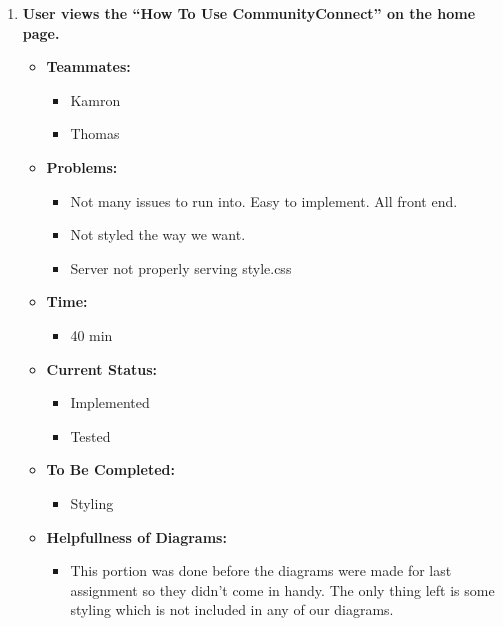 \documentclass[12pt]{article}
\begin{document}
  \begin{enumerate}
    \item \textbf{User views the “How To Use CommunityConnect” on the home page.}
      \begin{itemize}
        \item \textbf{Teammates:}
          \begin{itemize}
            \item Kamron
            \item Thomas
          \end{itemize}
        \item \textbf{Problems:}
          \begin{itemize}
            \item Not many issues to run into. Easy to implement. All front end.
            \item Not styled the way we want.
            \item Server not properly serving style.css
          \end{itemize}
        \item \textbf{Time:}
          \begin{itemize}
            \item 40 min
          \end{itemize}
        \item \textbf{Current Status:}
          \begin{itemize}
            \item Implemented
            \item Tested
          \end{itemize}
        \item \textbf{To Be Completed:}
          \begin{itemize}
            \item Styling
          \end{itemize}
        \item \textbf{Helpfullness of Diagrams:}
          \begin{itemize}
            \item This portion was done before the diagrams were made for last assignment so they didn’t come in handy. The only thing left is some styling which is not included in any of our diagrams.
          \end{itemize}
      \end{itemize}


\end{enumerate}
\end{document}
